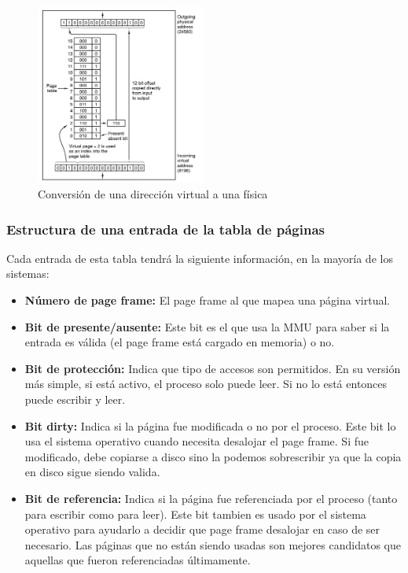 \begin{figure}[h]
	\centering
	\includegraphics[width=0.5\textwidth]{imagenes/virtual-a-fisica}
	\caption[]{Conversión de una dirección virtual a una física}
	\label{fig:virtual-a-fisica}
\end{figure}

\subsubsection{Estructura de una entrada de la tabla de páginas}
Cada entrada de esta tabla tendrá la siguiente información, en la mayoría de los sistemas:

\begin{itemize}
	\item \textbf{Número de page frame:} El page frame al que mapea una página virtual.
	\item \textbf{Bit de presente/ausente:} Este bit es el que usa la MMU para saber si la entrada es válida (el page frame está cargado en memoria) o no.
	\item \textbf{Bit de protección:} Indica que tipo de accesos son permitidos. En su versión más simple, si está activo, el proceso solo puede leer. Si no lo está entonces puede escribir y leer.
	\item \textbf{Bit dirty:} Indica si la página fue modificada o no por el proceso. Este bit lo usa el sistema operativo cuando necesita desalojar el page frame. Si fue modificado, debe copiarse a disco sino la podemos sobrescribir ya que la copia en disco sigue siendo valida.
	\item \textbf{Bit de referencia:} Indica si la página fue referenciada por el proceso (tanto para escribir como para leer). Este bit tambien es usado por el sistema operativo para ayudarlo a decidir que page frame desalojar en caso de ser necesario. Las páginas que no están siendo usadas son mejores candidatos que aquellas que fueron referenciadas últimamente.
\end{itemize}

